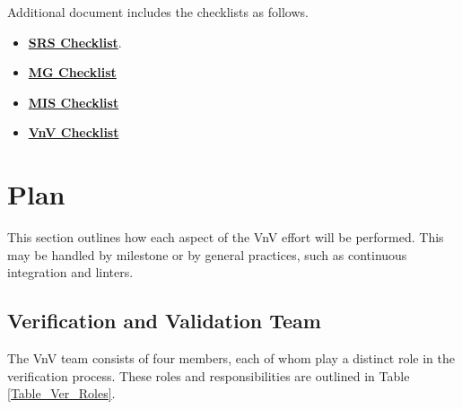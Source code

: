 \documentclass[12pt, titlepage]{article}
\begin{document}
Additional document includes the checklists as follows.
\begin{itemize}
\item \textbf{\href{https://github.com/KiranSingh15/CAS-741-Image-Correspondences/blob/
main/docs/Checklists/SRS-Checklist.pdf}
{SRS Checklist}}. 
\item \textbf{\href{https://github.com/KiranSingh15/CAS-741-Image-Correspondences/blob/main/docs/Checklists/MG-Checklist.pdf}
{MG Checklist}} 
\item \textbf{\href{https://github.com/KiranSingh15/CAS-741-Image-Correspondences/blob/main/docs/Checklists/MIS-Checklist.pdf}{MIS Checklist}}
\item \textbf{\href{https://github.com/KiranSingh15/CAS-741-Image-Correspondences/blob/main/docs/Checklists/VnV-Checklist.pdf}
{VnV Checklist}}
\end{itemize}

\section{Plan}
This section outlines how each aspect of the VnV effort will be performed. This may be handled by 
milestone or by general practices, such as continuous integration and linters. 

\subsection{Verification and Validation Team}
The VnV team consists of four members, each of whom play a distinct role in the 
verification process. These roles and responsibilities are outlined in Table \ref{Table_Ver_Roles}.
\end{document}

